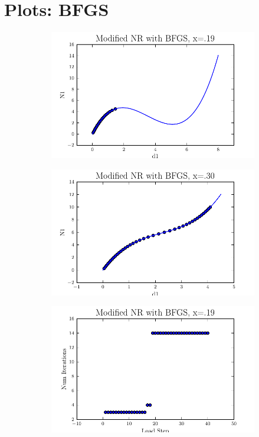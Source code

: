 \documentclass[10pt,letterpaper]{article}
\begin{document}
\section{Plots: BFGS}
\begin{figure}[!tbh]
  \begin{subfigure}[b]{.6\textwidth}
    \includegraphics[width=\textwidth]{moded_nr_bfgs_x19.pdf}
    \caption{}
    \label{fig5:label:a}
  \end{subfigure}
  \hfill
  \begin{subfigure}[b]{.6\textwidth}
    \includegraphics[width=\textwidth]{moded_nr_bfgs_x30.pdf}
    \caption{}
    \label{fig5:label:b}
  \end{subfigure}
  \hfill
    \begin{subfigure}[b]{.6\textwidth}
    \includegraphics[width=\textwidth]{moded_nr_bfgs_x19_conv.pdf}

\end{subfigure}
\end{figure}
\end{document}
